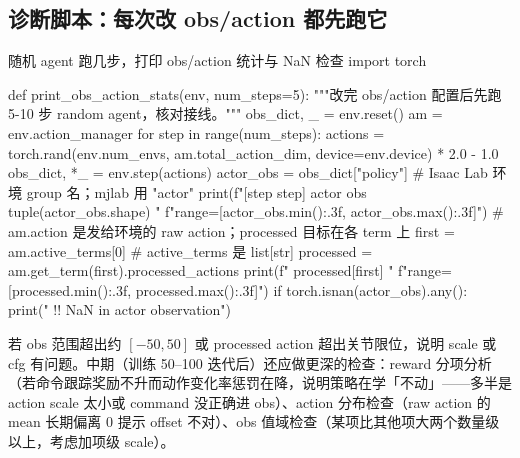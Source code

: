 \subsection{诊断脚本：每次改 obs/action 都先跑它}
\label{sec:rlmc-diagnostic}

\begin{codebox}[Python]{随机 agent 跑几步，打印 obs/action 统计与 NaN 检查}
import torch

def print_obs_action_stats(env, num_steps=5):
    """改完 obs/action 配置后先跑 5-10 步 random agent，核对接线。"""
    obs_dict, _ = env.reset()
    am = env.action_manager
    for step in range(num_steps):
        actions = torch.rand(env.num_envs, am.total_action_dim,
                             device=env.device) * 2.0 - 1.0
        obs_dict, *_ = env.step(actions)
        actor_obs = obs_dict["policy"]      # Isaac Lab 环境 group 名；mjlab 用 "actor"
        print(f"[step {step}] actor obs {tuple(actor_obs.shape)} "
              f"range=[{actor_obs.min():.3f}, {actor_obs.max():.3f}]")
        # am.action 是发给环境的 raw action；processed 目标在各 term 上
        first = am.active_terms[0]           # active_terms 是 list[str]
        processed = am.get_term(first).processed_actions
        print(f"          processed[{first}] "
              f"range=[{processed.min():.3f}, {processed.max():.3f}]")
        if torch.isnan(actor_obs).any():
            print("  !! NaN in actor observation")
\end{codebox}

若 obs 范围超出约 $[-50,50]$ 或 processed action 超出关节限位，说明 scale 或 cfg 有问题。中期（训练 50--100 迭代后）还应做更深的检查：reward 分项分析（若命令跟踪奖励不升而动作变化率惩罚在降，说明策略在学「不动」——多半是 action scale 太小或 command 没正确进 obs）、action 分布检查（raw action 的 mean 长期偏离 0 提示 offset 不对）、obs 值域检查（某项比其他项大两个数量级以上，考虑加项级 scale）。

